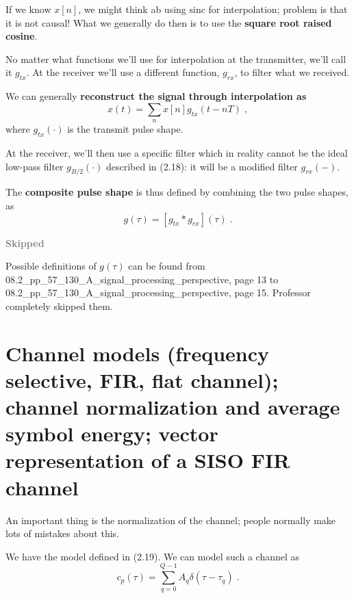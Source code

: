 \documentclass[a4paper, 12pt]{book}
\begin{document}
\clearpage %

If we know $x[n]$, we might think ab using $\text{sinc}$ for interpolation; problem is that it is not causal!
What we generally do then is to use the \textbf{square root raised cosine}.

No matter what functions we'll use for interpolation at the transmitter, we'll call it $g_{tx}$.
At the receiver we'll use a different function, $g_{rx}$, to filter what we received.

We can generally \textbf{reconstruct the signal through interpolation as}
\begin{equation}
x(t) = \sum_{n} x[n] g_{tx}(t - nT) \;, \tag{2.41}
\end{equation}
where $g_{tx}(\cdot)$ is the transmit pulse shape.

At the receiver, we'll then use a specific filter which in reality cannot be the ideal low-pass filter $g_{B/2}(\cdot)$ described in (2.18): it will be a modified filter $g_{rx}(-)$.

The \textbf{composite pulse shape} is thus defined by combining the two pulse shapes, as
\begin{equation}
g(\tau) = [g_{tx} * g_{rx}](\tau) \;. \tag{2.42}
\end{equation}

\begin{tcolorbox}[colframe=gray, colback=white, boxrule=1pt, arc=2pt]
    \textcolor{gray}{\textbf{Skipped}}

    Possible definitions of $g(\tau)$ can be found from \textcolor{green!60!black}{08.2\_pp\_57\_130\_A\_signal\_processing\_perspective, page 13} to \textcolor{green!60!black}{08.2\_pp\_57\_130\_A\_signal\_processing\_perspective, page 15}. Professor completely skipped them.
\end{tcolorbox}

\section[Channel models]{Channel models (frequency selective, FIR, flat channel); channel normalization and average symbol energy; vector representation of a SISO FIR channel}

An important thing is the normalization of the channel; people normally make lots of mistakes about this.

We have the model defined in (2.19).
We can model such a channel as
\begin{equation}
c_p(\tau) = \sum_{q=0}^{Q-1} A_q \delta(\tau - \tau_q) \;. \tag{2.19}
\end{equation}
\end{document}
